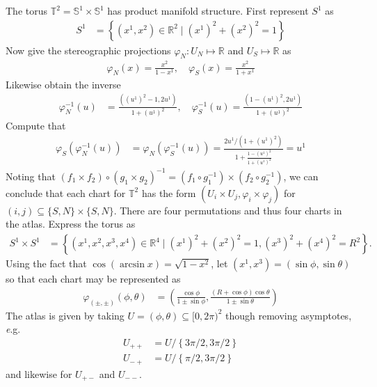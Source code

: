 \documentclass[10pt]{scrartcl}
\newcommand{\eg}{{\textit e.g.}}
\begin{document}
The torus $\mathbb{T}^2 = \mathbb{S}^1 \times \mathbb{S}^1$ has product manifold structure. First represent $S^1$ as 
\begin{align}
S^1 &= \left\{(x^1, x^2)\in\mathbb{R}^2 \mid (x^1)^2 + (	x^2)^2=1\right\}
\end{align}
Now give the stereographic projections $\varphi_N: U_N\mapsto \mathbb{R}$ and $U_S\mapsto \mathbb{R}$ as
\begin{align}
\varphi_N(x) = \frac{x^2}{1-x^1},\quad\varphi_S(x) = \frac{x^2}{1+x^1} 
\end{align}
Likewise obtain the inverse
\begin{align}
\varphi_{N}^{-1}(u) &= \frac{((u^1)^2 - 1, 2u^1)}{1 + (u^1)^2},\quad \varphi_{S}^{-1}(u) = \frac{(1 - (u^1)^2, 2u^1)}{1 + (u^1)^2}
\end{align}
Compute that
\begin{align*}
	\varphi_S(\varphi_{N}^{-1}(u)) &= \varphi_N(\varphi_{S}^{-1}(u))= \frac{2u^1/(1+(u^1)^2)}{1 + \frac{1-(u^1)^2}{1+(u^1)^2}} = u^1 
\end{align*}
Noting that $(f_1\times f_2)\circ (g_1\times g_2)^{-1} = (f_1\circ g_{1}^{-1})\times (f_2\circ g_{2}^{-1})$, we can conclude that each chart for $\mathbb{T}^2$ has the form $\left(U_i\times U_j, \varphi_i\times \varphi_j\right)$ for $(i, j)\subseteq \{S, N\}\times\{S, N\}$. There are four permutations and thus four charts in the atlas. Express the torus as 
\begin{align}
S^1\times S^1 &= \left\{(x^1, x^2, x^3, x^4)\in\mathbb{R}^4 \mid (x^1)^2 + (	x^2)^2=1,(x^3)^2 + (	x^4)^2=R^2\right\}. 
\end{align}
Using the fact that $\cos(\arcsin{x}) = \sqrt{1-x^2}$, let $(x^1, x^3) = (\sin\phi, \sin\theta)$ so that each chart may be represented as
\begin{align}
\varphi_{(\pm,\pm)}(\phi, \theta) &= \left(\frac{\cos\phi}{1\pm\sin\phi}, \frac{(R + \cos{\phi})\cos{\theta}}{1\pm\sin\theta}\right)	
\end{align}
The atlas is given by taking $U = (\phi, \theta)\subseteq [0, 2\pi)^2$ though removing asymptotes, \eg 
\begin{align} 
	U_{++} &= U/\left\{3\pi/2,3\pi/2\right\}\\ 
	U_{-+} &= U/\left\{\pi/2,3\pi/2\right\}
\end{align}
and likewise for $U_{+-}$ and $U_{--}$.
\end{document}

